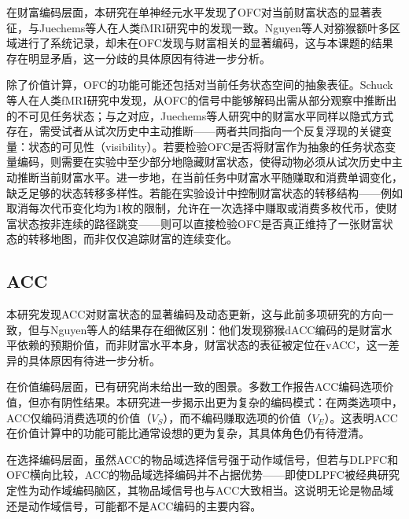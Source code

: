 在财富编码层面，本研究在单神经元水平发现了OFC对当前财富状态的显著表征，与Juechems等人\citep{juechems2017ventromedial}在人类fMRI研究中的发现一致。Nguyen等人\citep{nguyen2025neural}对猕猴额叶多区域进行了系统记录，却未在OFC发现与财富相关的显著编码，这与本课题的结果存在明显矛盾，这一分歧的具体原因有待进一步分析。

除了价值计算，OFC的功能可能还包括对当前任务状态空间的抽象表征\citep{wilson2014orbitofrontal,wikenheiser2016cognitive,knudsen2022taking}。Schuck等人\citep{schuck2016human}在人类fMRI研究中发现，从OFC的信号中能够解码出需从部分观察中推断出的不可见任务状态；与之对应，Juechems等人\citep{juechems2017ventromedial}研究中的财富水平同样以隐式方式存在，需受试者从试次历史中主动推断——两者共同指向一个反复浮现的关键变量：状态的可见性（visibility）。若要检验OFC是否将财富作为抽象的任务状态变量编码，则需要在实验中至少部分地隐藏财富状态，使得动物必须从试次历史中主动推断当前财富水平。进一步地，在当前任务中财富水平随赚取和消费单调变化，缺乏足够的状态转移多样性。若能在实验设计中控制财富状态的转移结构——例如取消每次代币变化均为1枚的限制，允许在一次选择中赚取或消费多枚代币，使财富状态按非连续的路径跳变——则可以直接检验OFC是否真正维持了一张财富状态的转移地图，而非仅仅追踪财富的连续变化。

\subsection{ACC}\label{chap4_2_10:ACC}

本研究发现ACC对财富状态的显著编码及动态更新，这与此前多项研究的方向一致\citep{seo2009behavioral,yang2022primate,ferro2026accumulation}，但与Nguyen等人\citep{nguyen2025neural}的结果存在细微区别：他们发现猕猴dACC编码的是财富水平依赖的预期价值，而非财富水平本身，财富状态的表征被定位在vACC，这一差异的具体原因有待进一步分析。

在价值编码层面，已有研究尚未给出一致的图景。多数工作报告ACC编码选项价值\citep{kennerley2009neurons, prevost2010separate, hosokawa2013mechanisms, nguyen2025neural, ferro2026accumulation}，但亦有阴性结果\citep{cai2012neuronal}。本研究进一步揭示出更为复杂的编码模式：在两类选项中，ACC仅编码消费选项的价值（$V_S$），而不编码赚取选项的价值（$V_E$）。这表明ACC在价值计算中的功能可能比通常设想的更为复杂，其具体角色仍有待澄清。

在选择编码层面，虽然ACC的物品域选择信号强于动作域信号，但若与DLPFC和OFC横向比较，ACC的物品域选择编码并不占据优势——即使DLPFC被经典研究定性为动作域编码脑区，其物品域信号也与ACC大致相当。这说明无论是物品域还是动作域信号，可能都不是ACC编码的主要内容。

